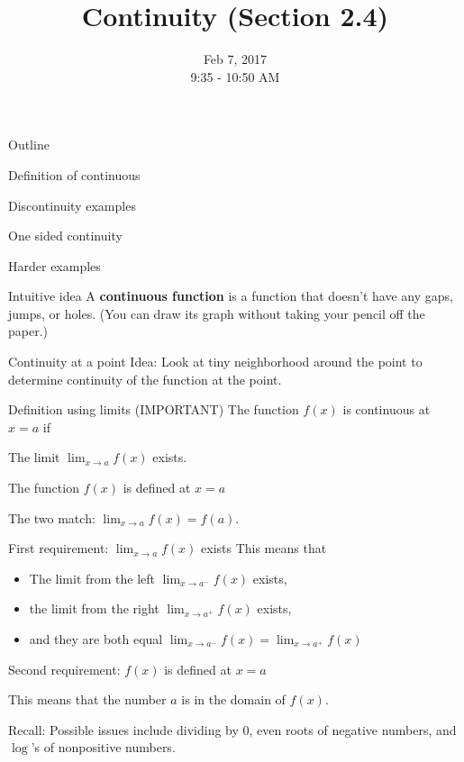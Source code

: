 \documentclass[t]{beamer}
\title{Continuity (Section 2.4)}
\date{Feb 7, 2017 \\ 9:35 - 10:50 AM}
\newenvironment{fpi}
  {\itemize[nolistsep,itemsep=\fill]}
  {\vfill\enditemize}
\begin{document}
\frame{\titlepage}

\begin{frame}{Outline}
\begin{fpi}
\item Definition of continuous
\item Discontinuity examples
\item One sided continuity
\item Harder examples
\end{fpi}
\end{frame}

\begin{frame}{Intuitive idea}
A \textbf{continuous function} is a function that doesn't have
any gaps, jumps, or holes.  (You can draw its graph without taking your pencil off the paper.)
\end{frame}

\begin{frame}{Continuity at a point}
Idea: Look at tiny neighborhood around the point to determine continuity of the function
at the point.
\end{frame}

\begin{frame}{Definition using limits (IMPORTANT)}
The function $f(x)$ is continuous at $x = a$ if 
\begin{fpi}
\item The limit $\displaystyle \lim_{x \to a} f(x)$ exists.
\item The function $f(x)$ is defined at $x = a$
\item The two match: $\displaystyle \lim_{x \to a} f(x) = f(a)$.
\end{fpi}
\end{frame}

\begin{frame}{First requirement: $\displaystyle \lim_{x \to a} f(x)$ exists}
This means that 
\begin{itemize}
\item The limit from the left $\displaystyle \lim_{x \to a^-} f(x)$ exists,
\item the limit from the right $\displaystyle \lim_{x \to a^+} f(x)$ exists,
\item and they are both equal $\displaystyle  \lim_{x \to a^-} f(x) = \lim_{x \to a^+} f(x)$
\end{itemize}
\end{frame}


\begin{frame}{Second requirement:  $f(x)$ is defined at $x = a$}
\begin{fpi}
\item This means that the number $a$ is in the domain of $f(x)$.
\item Recall: Possible issues include dividing by 0, even roots of negative numbers,
and $\log$'s of nonpositive numbers.
\end{fpi}
\end{frame}
\end{document}
